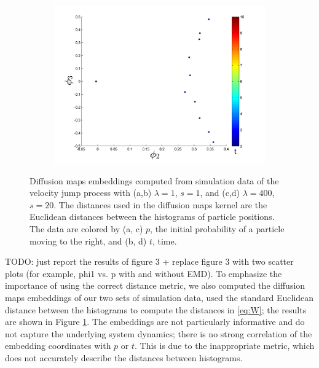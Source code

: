 \documentclass[prl, reprint, final, showkeys]{revtex4-1}
\begin{document}
\begin{figure}[t]
\begin{subfigure}{\figwidth}
\caption{}
\end{subfigure}
\begin{subfigure}{\figwidth}
\includegraphics[width=\textwidth]{rawhist_t_400}
\caption{}
\end{subfigure}
\caption{Diffusion maps embeddings computed from simulation data of the velocity jump process with (a,b) $\lambda=1$, $s=1$, and (c,d) $\lambda=400$, $s=20$. The distances used in the diffusion maps kernel are the Euclidean distances between the histograms of particle positions. The data are colored by (a, c) $p$, the initial probability of a particle moving to the right, and (b, d) $t$, time.}
\label{fig:dmaps_embed_noemd}
\end{figure}

TODO: just report the results of figure 3 + replace figure 3 with two scatter plots (for example, phi1 vs. p with and without EMD).
To emphasize the importance of using the correct distance metric, we also computed the diffusion maps embeddings of our two sets of simulation data, used the standard Euclidean distance between the histograms to compute the distances in \eqref{eq:W}; the results are shown in Figure \ref{fig:dmaps_embed_noemd}.
%
The embeddings are not particularly informative and do not capture the underlying system dynamics; there is no strong correlation of the embedding coordinates with $p$ or $t$. 
%
This is due to the inappropriate metric, which does not accurately describe the distances between histograms.
\end{document}
